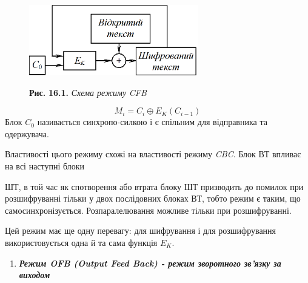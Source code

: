 \begin{figure}
\centering
\begin{minipage}{2.9866in}
 \includegraphics[width=2.8957in,height=1.2083in]{crypt-img/crypt-img337.png} 

{\centering
\textbf{Рис. }\textbf{16.}\textbf{1.} \textit{Схема режим}\textit{у}\textit{
}\textit{CFB}
\par}
\end{minipage}
\end{figure}
\begin{equation*}
{M_{i}=C_{i}{\oplus}E_{K}(C_{i-1})}
\end{equation*}
Блок  $C_0$ називається синхропо{}-силкою і є спільним для відправника та
одержувача.

Властивості цього режиму схожі на властивості режиму \textit{CBC}. Блок ВТ
впливає на всі наступні блоки 

ШТ, в той час як спотворення або втрата блоку ШТ призводить до помилок при
розшифруванні тільки у двох послідовних блоках ВТ, тобто режим є таким, що
самосинхронізується. Розпаралелювання можливе тільки при розшифруванні.

Цей режим має ще одну перевагу: для шифрування і для розшифрування
використовується одна й та сама функція  $E_K$.


\bigskip


\bigskip


\bigskip


\bigskip


\bigskip


\bigskip


\bigskip


\bigskip


\bigskip

\liststyleWWviiiNumxxi
\setcounter{saveenum}{\value{enumi}}
\begin{enumerate}
\setcounter{enumi}{\value{saveenum}}
\item {\centering\bfseries\itshape
Режим OFB (Output Feed Back) - режим зворотного зв’язку за виходом
\par}
\end{enumerate}

\bigskip


